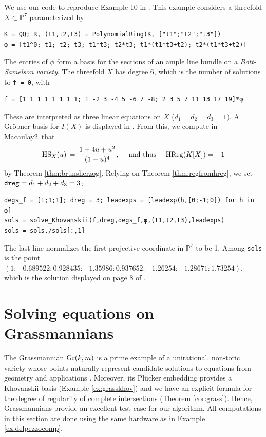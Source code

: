 \documentclass[12pt]{article}
\theoremstyle{definition}
\newenvironment{example}
  {\pushQED{\qed}\renewcommand{\qedsymbol}{$\diamond$}\examplex}
  {\popQED\endexamplex}
\theoremstyle{remark}
\begin{document}
\begin{example}[Equations on a Bott-Samelson variety]
We use our code to reproduce Example 10 in \cite{burr2020numerical}. This example considers a threefold $X \subset \mathbb{P}^7$ parameterized by 
\begin{verbatim}
K = QQ; R, (t1,t2,t3) = PolynomialRing(K, ["t1";"t2";"t3"])
φ = [t1^0; t1; t2; t3; t1*t3; t2*t3; t1*(t1*t3+t2); t2*(t1*t3+t2)]
\end{verbatim}
The entries of $\phi$ form a basis for the sections of an ample line bundle on a \emph{Bott-Samelson variety}. The threefold $X$ has degree 6, which is the number of solutions to \texttt{f = 0}, with
\begin{verbatim}
f = [1 1 1 1 1 1 1 1; 1 -2 3 -4 5 -6 7 -8; 2 3 5 7 11 13 17 19]*φ
\end{verbatim}
These are interpreted as three linear equations on $X$ ($d_1 = d_2 = d_3 = 1)$. A Gr\"obner basis for $I(X)$ is displayed in \cite[Example 10]{burr2020numerical}. From this, we compute in Macaulay2~that 
\[ {\rm HS}_X(u) \, = \, \frac{1 + 4u + u^2}{(1-u)^4}, \quad \text{ and thus } \quad  {\rm HReg}(K[X]) = -1\]
by Theorem \ref{thm:brunsherzog}. Relying on Theorem \ref{thm:regfromhreg}, we set ${\tt dreg} = d_1 + d_2 + d_3 = 3$:
\begin{verbatim}
degs_f = [1;1;1]; dreg = 3; leadexps = [leadexp(h,[0;-1;0]) for h in φ]
sols = solve_Khovanskii(f,dreg,degs_f,φ,(t1,t2,t3),leadexps)
sols = sols./sols[:,1]
\end{verbatim}
The last line normalizes the first projective coordinate in $\mathbb{P}^7$ to be 1. Among \texttt{sols} is the point
$(1:-0.689522:0.928435:-1.35986:0.937652:-1.26254:-1.28671:1.73254)$,
which is the solution displayed on page 8 of \cite{burr2020numerical}. 
\end{example}

\section{Solving equations on Grassmannians} \label{sec:7}

The Grassmannian ${\rm Gr}(k,m)$ is a prime example of a unirational, non-toric variety whose points naturally represent candidate solutions to equations from geometry and applications \cite{huber1998numerical}. Moreover, its Pl\"ucker embedding provides a Khovanskii basis (Example \ref{ex:grasskhov}) and we have an explicit formula for the degree of regularity of complete intersections (Theorem \ref{cor:grass}). Hence, Grassmannians provide an excellent test case for our algorithm. All computations in this section are done using the same hardware as in Example \ref{ex:delpezzocomp}.
\end{document}

